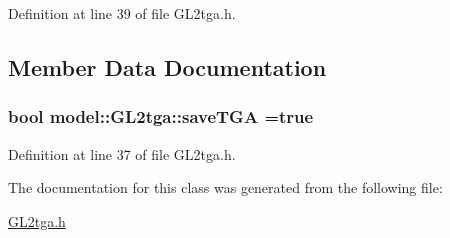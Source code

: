 Definition at line 39 of file G\+L2tga.\+h.



\subsection{Member Data Documentation}
\hypertarget{classmodel_1_1_g_l2tga_ab65e63ca4f17f1c2f8190938a137f9b3}{}
\subsubsection[{save\+T\+G\+A}]{\setlength{\rightskip}{0pt plus 5cm}bool model\+::\+G\+L2tga\+::save\+T\+G\+A =true\hspace{0.3cm}{\ttfamily [static]}}\label{classmodel_1_1_g_l2tga_ab65e63ca4f17f1c2f8190938a137f9b3}


Definition at line 37 of file G\+L2tga.\+h.



The documentation for this class was generated from the following file\+:\begin{DoxyCompactItemize}
\item 
\hyperlink{_g_l2tga_8h}{G\+L2tga.\+h}\end{DoxyCompactItemize}
